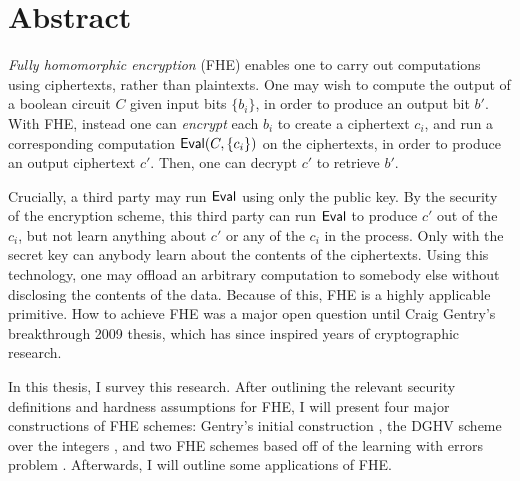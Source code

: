 \chapter*{Abstract}
	\emph{Fully homomorphic encryption} (FHE) enables one to carry out computations using ciphertexts, rather than plaintexts. One may wish to compute the output of a boolean circuit $C$ given input bits $\{b_i\}$, in order to produce an output bit $b'$. With FHE, instead one can \emph{encrypt} each $b_i$ to create a ciphertext $c_i$, and run a corresponding computation ${\sf Eval}(C, \{c_i\})$ on the ciphertexts, in order to produce an output ciphertext $c'$. Then, one can decrypt $c'$ to retrieve $b'$.

    Crucially, a third party may run ${\sf Eval}$ using only the public key. By the security of the encryption scheme, this third party can run ${\sf Eval}$ to produce $c'$ out of the $c_i$, but not learn anything about $c'$ or any of the $c_i$ in the process. Only with the secret key can anybody learn about the contents of the ciphertexts.
    Using this technology, one may offload an arbitrary computation to somebody else without disclosing the contents of the data. Because of this, FHE is a highly applicable primitive. How to achieve FHE was a major open question until Craig Gentry's breakthrough 2009 thesis, which has since inspired years of cryptographic research.

    In this thesis, I survey this research. After outlining the relevant security definitions and hardness assumptions for FHE, I will present four major constructions of FHE schemes: Gentry's initial construction \cite{gentry2009fully}, the DGHV scheme over the integers \cite{dghv}, and two FHE schemes based off of the learning with errors problem \cite{bgv2011} \cite{gsw}. Afterwards, I will outline some applications of FHE.
